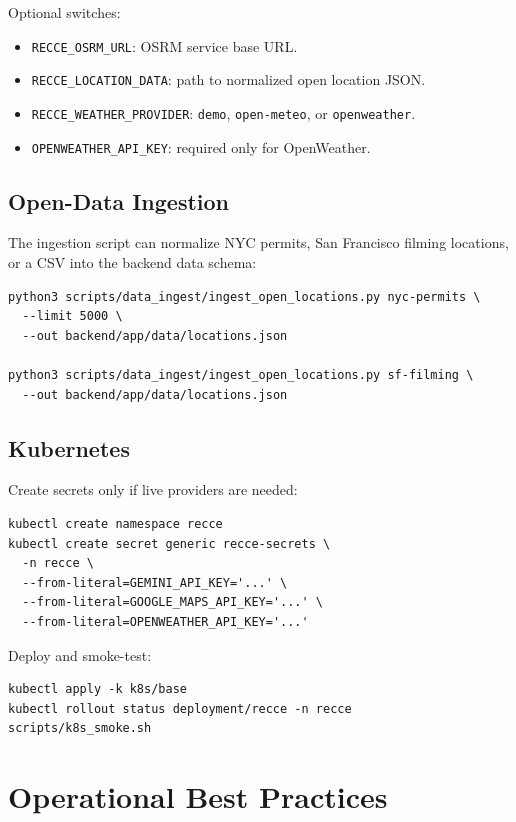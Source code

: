 \documentclass[11pt]{article}
\begin{document}
Optional switches:

\begin{itemize}[leftmargin=*]
  \item \texttt{RECCE\_OSRM\_URL}: OSRM service base URL.
  \item \texttt{RECCE\_LOCATION\_DATA}: path to normalized open location JSON.
  \item \texttt{RECCE\_WEATHER\_PROVIDER}: \texttt{demo}, \texttt{open-meteo}, or \texttt{openweather}.
  \item \texttt{OPENWEATHER\_API\_KEY}: required only for OpenWeather.
\end{itemize}

\subsection{Open-Data Ingestion}

The ingestion script can normalize NYC permits, San Francisco filming locations,
or a CSV into the backend data schema:

\begin{lstlisting}
python3 scripts/data_ingest/ingest_open_locations.py nyc-permits \
  --limit 5000 \
  --out backend/app/data/locations.json

python3 scripts/data_ingest/ingest_open_locations.py sf-filming \
  --out backend/app/data/locations.json
\end{lstlisting}

\subsection{Kubernetes}

Create secrets only if live providers are needed:

\begin{lstlisting}
kubectl create namespace recce
kubectl create secret generic recce-secrets \
  -n recce \
  --from-literal=GEMINI_API_KEY='...' \
  --from-literal=GOOGLE_MAPS_API_KEY='...' \
  --from-literal=OPENWEATHER_API_KEY='...'
\end{lstlisting}

Deploy and smoke-test:

\begin{lstlisting}
kubectl apply -k k8s/base
kubectl rollout status deployment/recce -n recce
scripts/k8s_smoke.sh
\end{lstlisting}

\section{Operational Best Practices}
\end{document}
